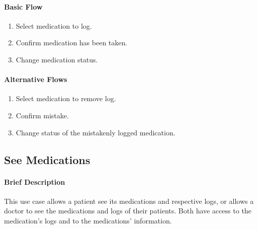 \documentclass{report}
\begin{document}
\begin{multicols}{2}
    \paragraph{Basic Flow}
    \begin{enumerate}
        \item Select medication to log.
        \item Confirm medication has been taken.
        \item Change medication status.
    \end{enumerate}
    \columnbreak

    \paragraph{Alternative Flows}
    \begin{enumerate}[label=A\arabic*.]
        \item Select medication to remove log.
        \item Confirm mistake.
        \item Change status of the mistakenly logged medication.
    \end{enumerate}
\end{multicols}

\vspace{1em}
\subsection{See Medications}
\paragraph{Brief Description}
This use case allows a patient see its medications and respective logs, or allows a doctor to see the medications and logs of their patients.
Both have access to the medication's logs and to the medications' information.
\end{document}
